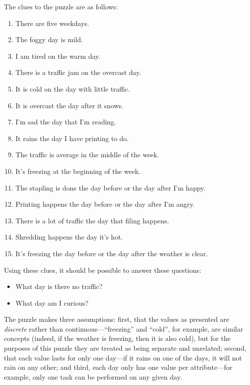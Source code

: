 \documentclass[a4paper,12pt,leqno]{article}
\begin{document}
\noindent
The clues to the puzzle are as follows:
\begin{enumerate}
	\item There are five weekdays.
	\item The foggy day is mild.
	\item I am tired on the warm day.
	\item There is a traffic jam on the overcast day.
	\item It is cold on the day with little traffic.
	\item It is overcast the day after it snows.
	\item I'm sad the day that I'm reading.
	\item It rains the day I have printing to do.
	\item The traffic is average in the middle of the week.
	\item It's freezing at the beginning of the week.
	\item The stapling is done the day before or the day after I'm happy.
	\item Printing happens the day before or the day after I'm angry.
	\item There is a lot of traffic the day that filing happens.
	\item Shredding happens the day it's hot.
	\item It's freezing the day before or the day after the weather is clear.
\end{enumerate}
Using these clues, it should be possible to answer these questions:
\begin{itemize}
	\item What day is there no traffic?
	\item What day am I curious? 
\end{itemize}
The puzzle makes three assumptions: first, that the values as presented are \textit{discrete} rather than continuous---``freezing'' and ``cold'', for example, are similar concepts (indeed, if the weather is freezing, then it is also cold), but for the purposes of this puzzle they are treated as being separate and unrelated; second, that each value lasts for only one day---if it rains on one of the days, it will not rain on any other; and third, each day only has one value per attribute---for example, only one task can be performed on any given day.
\end{document}
